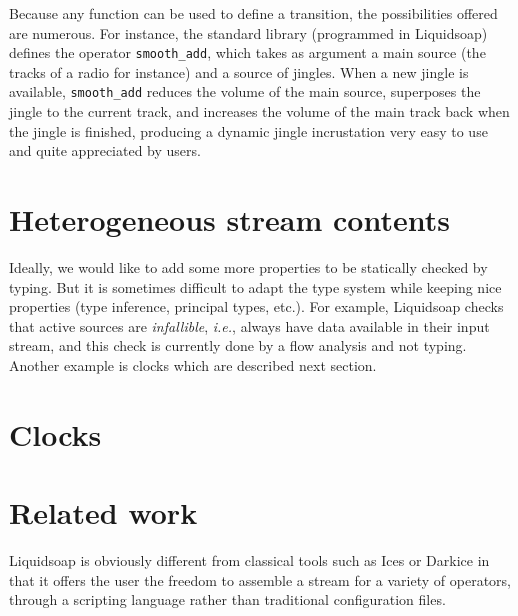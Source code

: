 \documentclass{llncs}
\newcommand{\liquidsoap}{Liquidsoap}
\newcommand{\ie}{\emph{i.e.},}
\begin{document}
Because any function can be used to define a transition, the possibilities
offered are numerous. For instance, the standard library (programmed in
\liquidsoap{}) defines the operator \texttt{smooth\_add}, which takes as
argument a main source (the tracks of a radio for instance) and a source of
jingles. When a new jingle is available, \texttt{smooth\_add} reduces the volume
of the main source, superposes the jingle to the current track, and increases
the volume of the main track back when the jingle is finished, producing a
dynamic jingle incrustation very easy to use and quite appreciated by
users.

\section{Heterogeneous stream contents}
\label{sec:content}



Ideally, we would like to add some more properties to be statically checked by
typing. But it is sometimes difficult to adapt the type system while keeping
nice properties (type inference, principal types, etc.). For example,
\liquidsoap{} checks that active sources are \emph{infallible}, \ie{} always
have data available in their input stream, and this check is currently done by a
flow analysis and not typing. Another example is clocks which are described next
section.


\section{Clocks}
\label{sec:clocks}


\section{Related work}

\liquidsoap{} is obviously different from classical tools
such as Ices or Darkice in
that it offers the user the freedom to assemble a stream
for a variety of operators, through a scripting
language rather than traditional configuration files.
\end{document}
